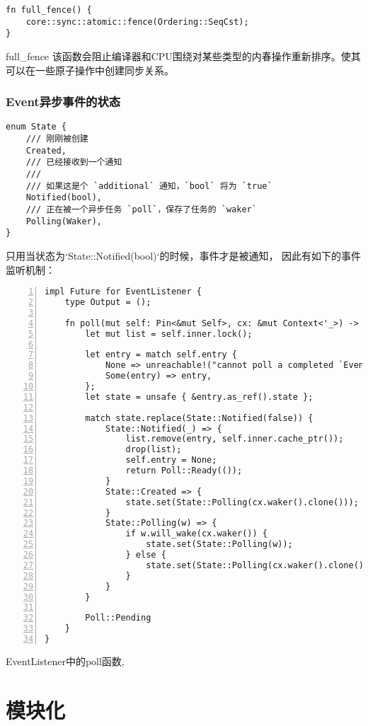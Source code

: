 \begin{lstlisting}[caption=full\_fence]
fn full_fence() {
    core::sync::atomic::fence(Ordering::SeqCst);
}
\end{lstlisting}

full\_fence 该函数会阻止编译器和CPU围绕对某些类型的内春操作重新排序。使其可以在一些原子操作中创建同步关系。

\subsubsection{Event异步事件的状态}
\begin{lstlisting}[caption=Event的状态]
enum State {
    /// 刚刚被创建
    Created,
    /// 已经接收到一个通知
    ///
    /// 如果这是个 `additional` 通知，`bool` 将为 `true`
    Notified(bool),
    /// 正在被一个异步任务 `poll`，保存了任务的 `waker`
    Polling(Waker),
}
\end{lstlisting}

只用当状态为`State::Notified(bool)`的时候，事件才是被通知， 因此有如下的事件监听机制：

\begin{lstlisting}[caption=Event的事件监听机制, numbers=left]
impl Future for EventListener {
    type Output = ();

    fn poll(mut self: Pin<&mut Self>, cx: &mut Context<'_>) -> Poll<Self::Output> {
        let mut list = self.inner.lock();

        let entry = match self.entry {
            None => unreachable!("cannot poll a completed `EventListener` future"),
            Some(entry) => entry,
        };
        let state = unsafe { &entry.as_ref().state };

        match state.replace(State::Notified(false)) {
            State::Notified(_) => {
                list.remove(entry, self.inner.cache_ptr());
                drop(list);
                self.entry = None;
                return Poll::Ready(());
            }
            State::Created => {
                state.set(State::Polling(cx.waker().clone()));
            }
            State::Polling(w) => {
                if w.will_wake(cx.waker()) {
                    state.set(State::Polling(w));
                } else {
                    state.set(State::Polling(cx.waker().clone()));
                }
            }
        }

        Poll::Pending
    }
}
\end{lstlisting}

EventListener中的poll函数, 

\section{模块化}